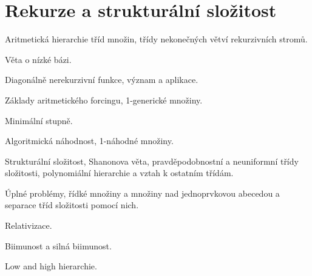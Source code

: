 \newpage
\section{Rekurze a strukturální složitost}
\begin{pozadavky}
\begin{pitemize}
\item Aritmetická hierarchie tříd množin, třídy nekonečných větví rekurzivních stromů.
\item Věta o nízké bázi.
\item Diagonálně nerekurzivní funkce, význam a aplikace.
\item Základy aritmetického forcingu, 1-generické množiny.
\item Minimální stupně.
\item Algoritmická náhodnost, 1-náhodné množiny.
\item Strukturální složitost, Shanonova věta, pravděpodobnostní a neuniformní třídy složitosti, polynomiální hierarchie a vztah k ostatním třídám.
\item Úplné problémy, řídké množiny a množiny nad jednoprvkovou abecedou a separace tříd složitosti pomocí nich.
\item Relativizace.
\item Biimunost a silná biimunost.
\item Low and high hierarchie.
\end{pitemize}
\end{pozadavky}